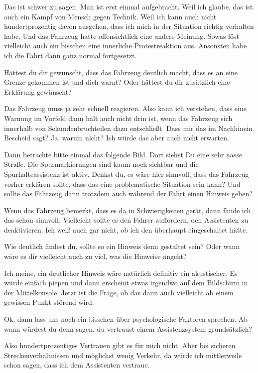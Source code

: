 Das ist schwer zu sagen. Man ist erst einmal aufgebracht. Weil ich
glaube, das ist auch ein Kampf von Mensch gegen Technik. Weil ich kann
auch nicht hundertprozentig davon ausgehen, dass ich mich in der
Situation richtig verhalten habe. Und das Fahrzeug hatte offensichtlich
eine andere Meinung. Sowas löst vielleicht auch ein bisschen eine
innerliche Protestreaktion aus. Ansonsten habe ich die Fahrt dann ganz
normal fortgesetzt.

\interviewerin
Hättest du dir gewünscht, dass das Fahrzeug deutlich macht, dass es an
eine Grenze gekommen ist und dich warnt? Oder hättest du dir zusätzlich
eine Erklärung gewünscht?

Das Fahrzeug muss ja sehr schnell reagieren. Also kann ich verstehen,
dass eine Warnung im Vorfeld dann halt auch nicht drin ist, wenn das
Fahrzeug sich innerhalb von Sekundenbruchteilen dazu entschließt. Dass
mir das im Nachhinein Bescheid sagt? Ja, warum nicht? Ich würde das aber
auch nicht erwarten.

\interviewerin
Dann betrachte bitte einmal das folgende Bild. Dort siehst Du eine sehr
nasse Straße. Die Spurmarkierungen sind kaum noch sichtbar und die
Spurhalteassistenz ist aktiv. Denkst du, es wäre hier sinnvoll, dass
das Fahrzeug vorher erklären sollte, dass das eine problematische
Situation sein kann? Und sollte das Fahrzeug dann trotzdem auch während
der Fahrt einen Hinweis geben?

Wenn das Fahrzeug bemerkt, dass es da in Schwierigkeiten gerät, dann
fände ich das schon sinnvoll. Vielleicht sollte es den Fahrer
auffordern, den Assistenten zu deaktivieren. Ich weiß auch gar nicht, ob
ich den überhaupt eingeschaltet hätte.

\interviewerin
Wie deutlich findest du, sollte so ein Hinweis denn gestaltet sein?
Oder wann wäre es dir vielleicht auch zu viel, was die Hinweise angeht?

Ich meine, ein deutlicher Hinweis wäre natürlich definitiv ein
akustischer. Es würde einfach piepen und dann erscheint etwas irgendwo
auf dem Bildschirm in der Mittelkonsole. Jetzt ist die Frage, ob das
dann auch vielleicht ab einem gewissen Punkt störend wird.

\interviewerin
Ok, dann lass uns noch ein bisschen über psychologische Faktoren
sprechen. Ab wann würdest du denn sagen, du vertraust einem
Assistenzsystem grundsätzlich?

Also hundertprozentiges Vertrauen gibt es für mich nicht. Aber bei
sicheren Streckenverhältnissen und möglichst wenig Verkehr, da würde ich
mittlerweile schon sagen, dass ich dem Assistenten vertraue.

